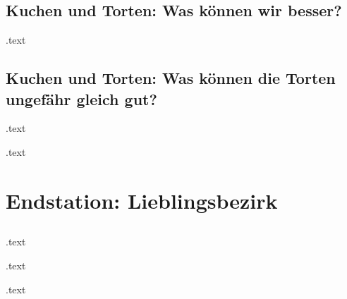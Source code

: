 \documentclass[pdf]{beamer}
\begin{document}
		\subsection{Kuchen und Torten: Was können wir besser?}
			\begin{frame}
			.text
			\end{frame}
		\subsection{Kuchen und Torten: Was können die Torten ungefähr gleich gut?}
			\begin{frame}
			.text
			\end{frame}
			\begin{frame}
			.text
			\end{frame}
	\section{Endstation: Lieblingsbezirk}
	\subsection*{}
		\begin{frame}
			.text
		\end{frame}
		\begin{frame}
		.text
		\end{frame}
		\begin{frame}
		.text
		\end{frame}
\end{document}
